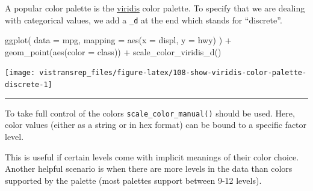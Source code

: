 \documentclass[]{book}
\newenvironment{Shaded}{}{}
\newcommand{\DataTypeTok}[1]{#1}
\newcommand{\KeywordTok}[1]{\textcolor[rgb]{0.00,0.00,1.00}{#1}}
\newcommand{\NormalTok}[1]{#1}
\newcommand{\OperatorTok}[1]{#1}
\newcommand{\StringTok}[1]{\textcolor[rgb]{0.00,0.50,0.50}{#1}}
\begin{document}
A popular color palette is the \href{https://cran.r-project.org/web/packages/viridis/vignettes/intro-to-viridis.html\#gallery}{viridis} color palette.
To specify that we are dealing with categorical values, we add a \texttt{\_d} at the end which stands for ``discrete''.

\begin{Shaded}
\begin{Highlighting}[]
\KeywordTok{ggplot}\NormalTok{(}
  \DataTypeTok{data =}\NormalTok{ mpg,}
  \DataTypeTok{mapping =} \KeywordTok{aes}\NormalTok{(}\DataTypeTok{x =}\NormalTok{ displ, }\DataTypeTok{y =}\NormalTok{ hwy)}
\NormalTok{) }\OperatorTok{+}
\StringTok{  }\KeywordTok{geom_point}\NormalTok{(}\KeywordTok{aes}\NormalTok{(}\DataTypeTok{color =}\NormalTok{ class)) }\OperatorTok{+}
\StringTok{  }\KeywordTok{scale_color_viridis_d}\NormalTok{()}
\end{Highlighting}
\end{Shaded}

\begin{flushright}\texttt{[image: vistransrep\_files/figure-latex/108-show-viridis-color-palette-discrete-1]} \end{flushright}

\begin{center}\rule{0.5\linewidth}{\linethickness}\end{center}

To take full control of the colors \texttt{scale\_color\_manual()} should be used.
Here, color values (either as a string or in hex format) can be bound to a specific factor level.

This is useful if certain levels come with implicit meanings of their color choice.
Another helpful scenario is when there are more levels in the data than colors supported by the palette (most palettes support between 9-12 levels).

\begin{Shaded}
\end{Shaded}
\end{document}
